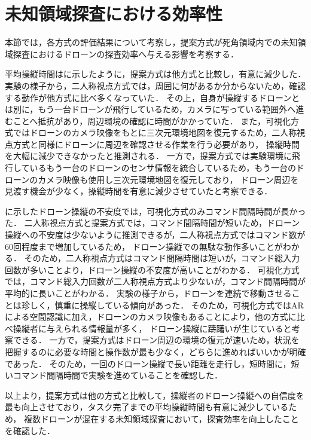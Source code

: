 \documentclass[a4paper,11pt]{ujreport}
\begin{document}
\section{未知領域探査における効率性}
\label{sec:Efficiency}

本節では，各方式の評価結果について考察し，提案方式が死角領域内での未知領域探査におけるドローンの探査効率へ与える影響を考察する．
\par
平均操縦時間はに示したように，提案方式は他方式と比較し，有意に減少した．
実験の様子から，二人称視点方式では，周囲に何があるか分からないため，確認する動作が他方式に比べ多くなっていた．
その上，自身が操縦するドローンとは別に，もう一台ドローンが飛行しているため，カメラに写っている範囲外へ進むことへ抵抗があり，周辺環境の確認に時間がかかっていた．
また，可視化方式ではドローンのカメラ映像をもとに三次元環境地図を復元するため，二人称視点方式と同様にドローンに周辺を確認させる作業を行う必要があり，
操縦時間を大幅に減少できなかったと推測される．
一方で，提案方式では実験環境に飛行しているもう一台のドローンのセンサ情報を統合しているため，もう一台のドローンのカメラ映像も使用し三次元環境地図を復元しており，
ドローン周辺を見渡す機会が少なく，操縦時間を有意に減少させていたと考察できる．
\par
{}に示したドローン操縦の不安度では，可視化方式のみコマンド間隔時間が長かった．
二人称視点方式と提案方式では，コマンド間隔時間が短いため，ドローン操縦への不安度は少ないように推測できるが，二人称視点方式ではコマンド数が60回程度まで増加しているため，
ドローン操縦での無駄な動作多いことがわかる．
そのため，二人称視点方式はコマンド間隔時間は短いが，コマンド総入力回数が多いことより，ドローン操縦の不安度が高いことがわかる．
可視化方式では，コマンド総入力回数が二人称視点方式より少ないが，コマンド間隔時間が平均的に長いことがわかる．
実験の様子から，ドローンを連続で移動させることは珍しく，慎重に操縦している傾向があった．
そのため，可視化方式ではARによる空間認識に加え，ドローンのカメラ映像もあることにより，他の方式に比べ操縦者に与えられる情報量が多く，
ドローン操縦に躊躇いが生じていると考察できる．
一方で，提案方式はドローン周辺の環境の復元が速いため，状況を把握するのに必要な時間と操作数が最も少なく，どちらに進めればいいかが明確であった．
そのため，一回のドローン操縦で長い距離を走行し，短時間に，短いコマンド間隔時間で実験を進めていることを確認した．

以上より，提案方式は他の方式と比較して，操縦者のドローン操縦への自信度を最も向上させており，タスク完了までの平均操縦時間も有意に減少しているため，
複数ドローンが混在する未知領域探査において，探査効率を向上したことを確認した．
\end{document}
